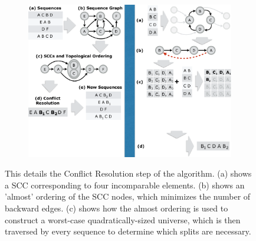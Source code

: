 \begin{figure}[t!] 
\begin{minipage}{1\linewidth}
\begin{subfigure}[c]{0.96\linewidth}
\includegraphics[trim={19.2cm 10cm 0 0}, clip, width=\linewidth]{figures/partial_ordering}
\end{subfigure} 
\end{minipage} 
\caption{This details the Conflict Resolution step of the algorithm. (a) shows a SCC corresponding to four incomparable elements. (b) shows an 'almost' ordering of the SCC nodes, which minimizes the number of backward edges. (c) shows how the almost ordering is used to construct a worst-case quadratically-sized universe, which is then traversed by every sequence to determine which splits are necessary. }
\label{fig:conflict_res}
\end{figure}

